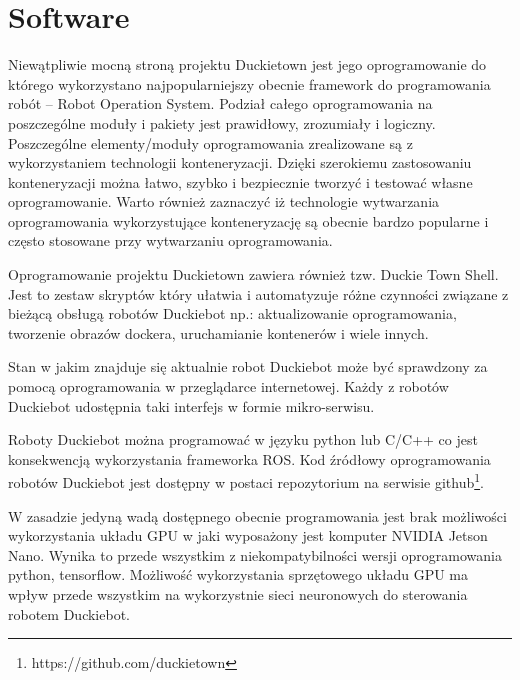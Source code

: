 \documentclass{svproc}
\begin{document}
\section{Software}\label{sec:software}
Niewątpliwie mocną stroną projektu Duckietown jest jego oprogramowanie do którego  wykorzystano najpopularniejszy obecnie framework do programowania robót -- Robot Operation System. 
Podział całego oprogramowania na poszczególne moduły i pakiety jest prawidłowy, zrozumiały i logiczny. 
Poszczególne elementy/moduły oprogramowania zrealizowane są z wykorzystaniem technologii konteneryzacji. Dzięki szerokiemu zastosowaniu konteneryzacji można łatwo, szybko i bezpiecznie tworzyć i testować własne oprogramowanie. Warto również zaznaczyć iż technologie wytwarzania oprogramowania wykorzystujące konteneryzację są obecnie bardzo popularne i często stosowane przy wytwarzaniu oprogramowania.  

Oprogramowanie projektu Duckietown zawiera również tzw. Duckie Town Shell. Jest to zestaw skryptów który ułatwia i automatyzuje różne czynności związane z bieżącą obsługą robotów Duckiebot np.: aktualizowanie oprogramowania, tworzenie obrazów dockera, uruchamianie kontenerów i wiele innych.

Stan w jakim znajduje się aktualnie robot Duckiebot może być sprawdzony za pomocą oprogramowania w przeglądarce internetowej. Każdy z robotów Duckiebot udostępnia taki interfejs w formie mikro-serwisu.

Roboty Duckiebot można programować w języku python lub C/C++ co jest konsekwencją wykorzystania frameworka ROS. Kod źródłowy oprogramowania robotów Duckiebot jest dostępny w postaci repozytorium na serwisie github\footnote{https://github.com/duckietown}.

W zasadzie jedyną wadą dostępnego obecnie programowania jest brak możliwości wykorzystania układu GPU w jaki wyposażony jest komputer NVIDIA Jetson Nano. Wynika to przede wszystkim z niekompatybilności wersji oprogramowania python, tensorflow. Możliwość wykorzystania sprzętowego układu GPU ma wpływ przede wszystkim na wykorzystnie sieci neuronowych do sterowania robotem Duckiebot.
\end{document}

